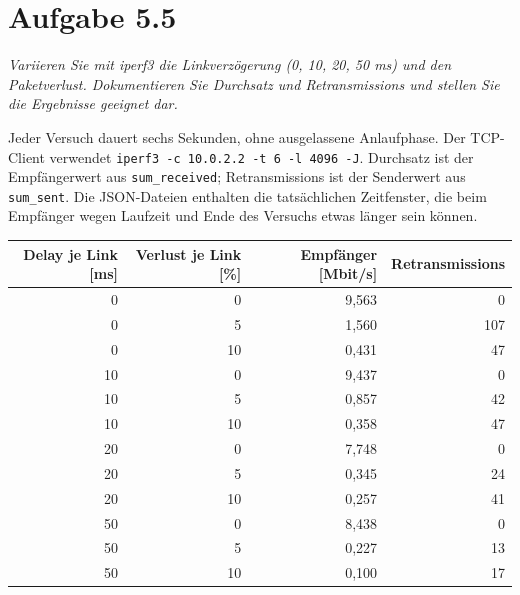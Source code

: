 \documentclass[a4paper,11pt]{article}
\newcommand{\aufgabe}[1]{\section*{Aufgabe #1}}
\newcommand{\angabe}[1]{\textit{#1}\par\smallskip}
\begin{document}
\aufgabe{5.5}
\angabe{Variieren Sie mit iperf3 die Linkverzögerung (0, 10, 20, 50 ms) und den Paketverlust. Dokumentieren Sie Durchsatz und Retransmissions und stellen Sie die Ergebnisse geeignet dar.}

Jeder Versuch dauert sechs Sekunden, ohne ausgelassene Anlaufphase.
Der TCP-Client verwendet \texttt{iperf3 -c 10.0.2.2 -t 6 -l 4096 -J}.
Durchsatz ist der Empfängerwert aus \texttt{sum\_received};
Retransmissions ist der Senderwert aus \texttt{sum\_sent}.
Die JSON-Dateien enthalten die tatsächlichen Zeitfenster, die beim Empfänger
wegen Laufzeit und Ende des Versuchs etwas länger sein können.
\begin{center}\begin{tabular}{rrrr}\toprule
Delay je Link [ms] & Verlust je Link [\%] & Empfänger [Mbit/s] & Retransmissions\\\midrule
0 & 0 & 9,563 & 0\\
0 & 5 & 1,560 & 107\\
0 & 10 & 0,431 & 47\\
10 & 0 & 9,437 & 0\\
10 & 5 & 0,857 & 42\\
10 & 10 & 0,358 & 47\\
20 & 0 & 7,748 & 0\\
20 & 5 & 0,345 & 24\\
20 & 10 & 0,257 & 41\\
50 & 0 & 8,438 & 0\\
50 & 5 & 0,227 & 13\\
50 & 10 & 0,100 & 17\\
\bottomrule\end{tabular}\end{center}

\begin{center}
\end{center}
\end{document}
